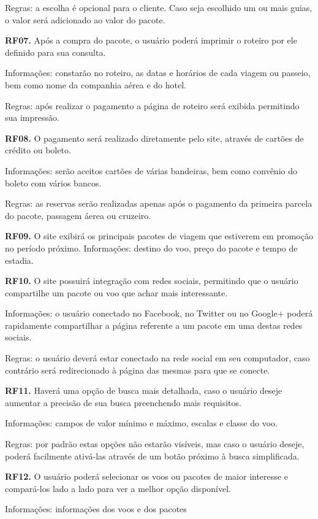 \documentclass[12pt]{article}
\begin{document}
Regras: a escolha é opcional para o cliente. Caso seja escolhido um ou mais guias, o valor será adicionado ao valor do pacote.

\bigskip
{\bf RF07.} Após a compra do pacote, o usuário poderá imprimir o roteiro por ele definido para sua consulta.

Informações: constarão no roteiro, as datas e horários de cada viagem ou passeio, bem como nome da companhia aérea e do hotel.

Regras: após realizar o pagamento a página de roteiro será exibida permitindo sua impressão.


\bigskip
{\bf RF08.} O pagamento será realizado diretamente pelo site, através de cartões de crédito ou boleto.

Informações: serão aceitos cartões de várias bandeiras, bem como convênio do boleto com vários bancos.

Regras: as reservas serão realizadas apenas após o pagamento da primeira parcela do pacote, passagem áerea ou cruzeiro.


\bigskip
{\bf RF09.} O site exibirá os principais pacotes de viagem que estiverem em promoção no período próximo.
Informações: destino do voo, preço do pacote e tempo de estadia.


\bigskip
{\bf RF10.} O site possuirá integração com redes sociais, permitindo que o usuário compartilhe um pacote ou voo que achar mais interessante.

Informações: o usuário conectado no Facebook, no Twitter ou no Google+ poderá rapidamente compartilhar a página referente a um pacote em uma destas redes sociais.

Regras: o usuário deverá estar conectado na rede social em seu computador, caso contrário será redirecionado à página das mesmas para que se conecte.


\bigskip
{\bf RF11.} Haverá uma opção de busca mais detalhada, caso o usuário deseje aumentar a precisão de sua busca preenchendo mais requisitos.

Informações: campos de valor mínimo e máximo, escalas e classe do voo.

Regras: por padrão estas opções não estarão visíveis, mas caso o usuário deseje, poderá facilmente ativá-las através de um botão próximo à busca simplificada.


\bigskip
{\bf RF12.} O usuário poderá selecionar os voos ou pacotes de maior interesse e compará-los lado a lado para ver a melhor opção disponível.

Informações: informações dos voos e dos pacotes
\end{document}
